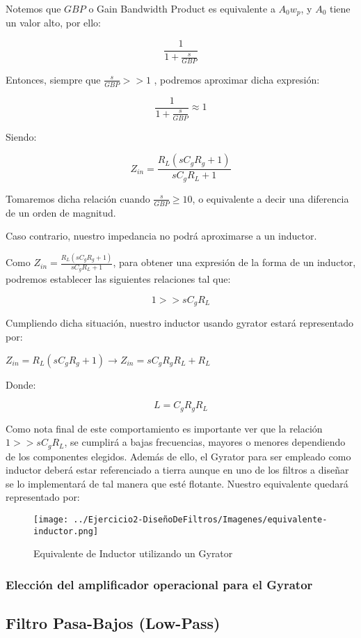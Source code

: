 Notemos que $GBP$ o Gain Bandwidth Product es equivalente a $A_0w_p$, y $A_0$ tiene un valor alto, por ello:

$$\frac{1}{1+\frac{s}{GBP}}$$

Entonces, siempre que $\frac{s}{GBP} >> 1$ , podremos aproximar dicha expresión:

$$\frac{1}{1+\frac{s}{GBP}} \approx 1$$

Siendo:

$$Z_{in}=\frac{R_L(sC_gR_g+1)}{sC_gR_L+1}$$

Tomaremos dicha relación cuando $\frac{s}{GBP} \geq 10$, o equivalente a decir una diferencia de un orden de magnitud.

Caso contrario, nuestro impedancia no podrá aproximarse a un inductor.

Como $Z_{in}=\frac{R_L(sC_gR_g+1)}{sC_gR_L+1}$, para obtener una expresión de la forma de un inductor,
podremos establecer las siguientes relaciones tal que:

$$1 >> sC_gR_L$$

Cumpliendo dicha situación, nuestro inductor usando gyrator estará representado por:

$Z_{in}=R_L(sC_gR_g+1)\longrightarrow Z_{in}=sC_gR_gR_L+R_L$

Donde:

$$L=C_gR_gR_L$$

Como nota final de este comportamiento es importante ver que la relación $1 >> sC_gR_L$, se cumplirá a bajas frecuencias,
mayores o menores dependiendo de los componentes elegidos. Además de ello, el Gyrator para ser empleado como inductor deberá estar
referenciado a tierra aunque en uno de los filtros a diseñar se lo implementará de tal manera que esté flotante.
Nuestro equivalente quedará representado por:

\begin{figure}[H]
    \centering
    \texttt{[image: ../Ejercicio2-DiseñoDeFiltros/Imagenes/equivalente-inductor.png]}
    \caption{Equivalente de Inductor utilizando un Gyrator}
\end{figure}

\subsubsection{Elección del amplificador operacional para el Gyrator}


\subsection{Filtro Pasa-Bajos (Low-Pass)}

